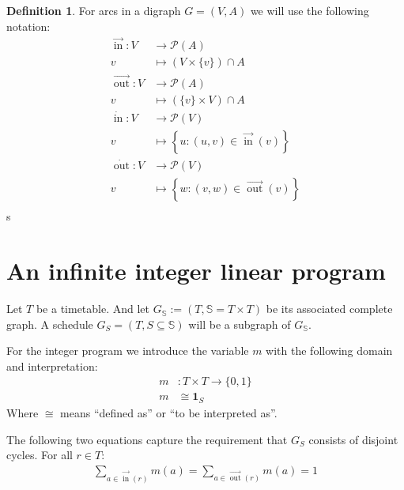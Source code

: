 \documentclass[a4paper]{amsart}
\theoremstyle{definition}
\newtheorem{defn}[theorem]{Definition}
\theoremstyle{remark}
\DeclareMathOperator{\In}{in}
\DeclareMathOperator{\Out}{out}
\newcommand{\ina}{\ensuremath{\vec{\In}}}
\newcommand{\outa}{\ensuremath{\vec{\Out}}}
\newcommand{\inv}{\ensuremath{\dot{\In}}}
\newcommand{\outv}{\ensuremath{\dot{\Out}}}
\begin{document}
\begin{defn}
For arcs in a digraph \(G=(V,A)\) we will use the following notation:
\begin{align*}
\ina\colon  V &\to \mathcal{P}(A) \\
v &\mapsto \left(V \times \{v\}\right) \cap A\\
\outa\colon  V &\to \mathcal{P}(A) \\
v &\mapsto \left(\{v\} \times V\right) \cap A\\
\inv\colon  V &\to \mathcal{P}(V) \\
v &\mapsto \left\{ u \colon \left(u,v\right) \in \ina(v) \right\}\\
\outv\colon  V &\to \mathcal{P}(V) \\
v &\mapsto \left\{w \colon \left(v,w\right) \in \outa\left(v\right) \right\}\\
\end{align*}s
\end{defn}

\section{An infinite integer linear program}
\label{infIP}

Let \(T\) be a timetable.  And let \(G_\mathbb{S} := (T, \mathbb{S} =
T \times T) \) be its associated complete graph.  A schedule \(G_S =
(T, S \subseteq \mathbb{S})\) will be a subgraph of \(G_\mathbb{S}\).


For the integer program we introduce the variable \(m\) with the
following domain and interpretation:
\begin{align}
  m & \colon T \times T \to \{0,1\} \\
  m & \cong \mathbf{1}_{S}
\end{align}
Where \(\cong\) means ``defined as'' or ``to be interpreted as''.

The following two equations capture the requirement that \(G_S\)
consists of disjoint cycles.  For all \(r \in T\):
\begin{align}
  \label{matchBedingung}
  \sum_{a \in \ina(r)}  m(a) = \sum_{a \in \outa(r)} m(a) = 1
\end{align}
\end{document}
